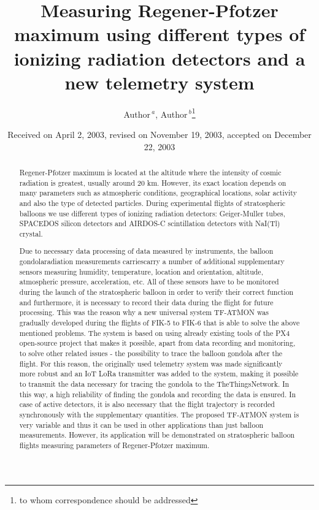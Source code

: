 \documentclass{Rpd}
\begin{document}
\def\Sectitle{Section Title}%

\def\copyrightyear{2004}%

\title[short Title]{Measuring Regener-Pfotzer maximum using different types of ionizing radiation detectors and a new telemetry system}
\author[Sample \textit{et~al}]{Author\,$^{ a}$, Author\,$^{ b}$\footnote{to whom correspondence should be addressed}}
\address{$^{ a}$Address followed, $^{ b}$Address followed}

\date{Received on April 2, 2003, revised on November 19, 2003,
  accepted on December 22, 2003}

\begin{abstract}
Regener-Pfotzer maximum is located at the altitude where the intensity of cosmic radiation is greatest, usually around 20 km. However, its exact location depends on many parameters such as atmospheric conditions, geographical locations, solar activity and also the type of detected particles. During experimental flights of stratospheric balloons we use different types of ionizing radiation detectors: Geiger-Muller tubes, SPACEDOS silicon detectors and AIRDOS-C scintillation detectors with NaI(Tl) crystal.

Due to necessary data processing of data measured by instruments, the balloon gondolaradiation measurements carriescarry a number of additional supplementary sensors measuring humidity, temperature, location and orientation, altitude, atmospheric pressure, acceleration, etc. All of these sensors have to be monitored during the launch of the stratospheric balloon in order to verify their correct function and furthermore, it is necessary to record their data during the flight for future processing. This was the reason why a new universal system TF-ATMON was gradually developed during the flights of FIK-5 to FIK-6 that is able to solve the above mentioned problems. The system is based on using already existing tools of the PX4 open-source project that makes it possible, apart from data recording and monitoring, to solve other related issues - the possibility to trace the balloon gondola after the flight. For this reason, the originally used telemetry system was made significantly more robust and an IoT LoRa transmitter was added to the system, making it possible to transmit the data necessary for tracing the gondola to the TheThingsNetwork. In this way, a high reliability of finding the gondola and recording the data is ensured. In case of active detectors, it is also necessary that the flight trajectory is recorded synchronously with the supplementary quantities.
The proposed TF-ATMON system is very variable and thus it can be used in other applications than just balloon measurements. However, its application will be demonstrated on stratospheric balloon flights measuring parameters of Regener-Pfotzer maximum.

\end{abstract}
\end{document}
